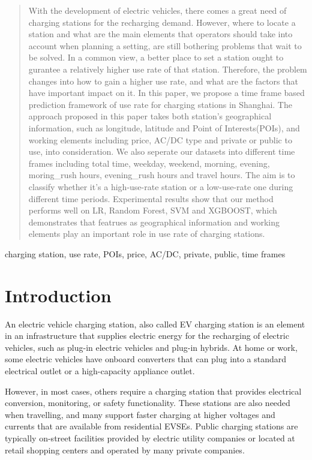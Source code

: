 \documentclass[conference]{IEEEtran}
\begin{document}
\begin{abstract}
With the development of electric vehicles, there comes a great need of charging stations for the recharging demand. However, where to locate a station and what are the main elements that operators should take into account when planning a setting, are still bothering problems that wait to be solved. In a common view, a better place to set a station ought to gurantee a relatively higher use rate of that station. Therefore, the problem changes into how to gain a higher use rate, and what are the factors that have important impact on it. In this paper, we propose a time frame based prediction framework of use rate for charging stations in Shanghai. The approach proposed in this paper takes both station's geographical information, such as longitude, latitude and Point of Interests(POIs), and working elements including price, AC/DC type and private or public to use, into consideration. We also seperate our datasets into different time frames including total time, weekday, weekend, morning, evening, moring\_rush hours, evening\_rush hours and travel hours. The aim is to classify whether it's a high-use-rate station or a low-use-rate one during different time periods. Experimental results show that our method performs well on LR, Random Forest, SVM and XGBOOST, which demonstrates that featrues as geographical information and working elements play an important role in use rate of charging stations.
\end{abstract}

\begin{IEEEkeywords}
charging station, use rate, POIs, price, AC/DC, private, public, time frames
\end{IEEEkeywords}

\section{Introduction}
An electric vehicle charging station, also called EV charging station is an element in an infrastructure that supplies electric energy for the recharging of electric vehicles, such as plug-in electric vehicles and plug-in hybrids. At home or work, some electric vehicles have onboard converters that can plug into a standard electrical outlet or a high-capacity appliance outlet. 

However, in most cases, others require a charging station that provides electrical conversion, monitoring, or safety functionality. These stations are also needed when travelling, and many support faster charging at higher voltages and currents that are available from residential EVSEs. Public charging stations are typically on-street facilities provided by electric utility companies or located at retail shopping centers and operated by many private companies.
\end{document}
